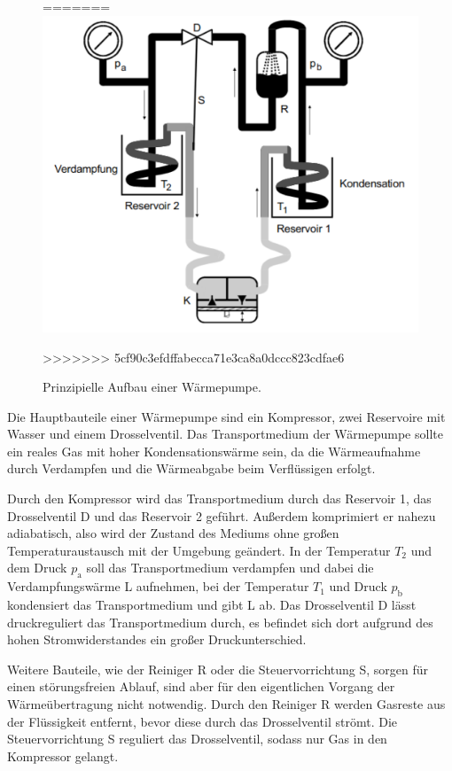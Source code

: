 \begin{figure}
=======
    \includegraphics[width=\textwidth]{Aufbau_Waermepumpe.pdf}
    \caption{Prinzipielle Aufbau einer Wärmepumpe.\cite[3]{anleitung}}    
>>>>>>> 5cf90c3efdffabecca71e3ca8a0dccc823cdfae6
\end{figure}
Die Hauptbauteile einer Wärmepumpe sind ein Kompressor, zwei Reservoire mit Wasser und einem Drosselventil.
Das Transportmedium der Wärmepumpe sollte ein reales Gas mit hoher Kondensationswärme sein, da die Wärmeaufnahme  durch Verdampfen und die Wärmeabgabe beim Verflüssigen erfolgt.

Durch den Kompressor wird das Transportmedium durch das Reservoir 1, das Drosselventil D und das Reservoir 2 geführt.
Außerdem komprimiert er nahezu adiabatisch, also wird der Zustand des Mediums ohne großen Temperaturaustausch mit der Umgebung geändert.
In der Temperatur $T_2$ und  dem Druck $p_{\text{a}}$ soll das Transportmedium verdampfen und dabei die Verdampfungswärme L aufnehmen, 
bei der Temperatur $T_1$ und Druck $p_{\text{b}}$ kondensiert das Transportmedium und gibt L ab.
Das Drosselventil D lässt druckreguliert das Transportmedium durch, es befindet sich dort aufgrund des hohen Stromwiderstandes ein großer Druckunterschied.

Weitere Bauteile, wie der Reiniger R oder die Steuervorrichtung S, sorgen für einen störungsfreien Ablauf, sind aber für den eigentlichen Vorgang der Wärmeübertragung nicht notwendig.
Durch den Reiniger R werden Gasreste aus der Flüssigkeit entfernt, bevor diese durch das Drosselventil strömt.
Die Steuervorrichtung S reguliert das Drosselventil, sodass nur Gas in den Kompressor gelangt. 

